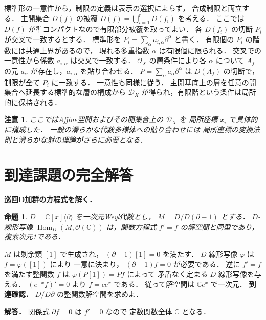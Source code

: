 \documentclass[a5paper,10pt,onecolumn]{jsarticle}
\makeatletter
\theoremstyle{mathnotetheorem}
\newtheorem{proposition}[theorem]{命題}
\newtheorem{remark}[theorem]{注意}
\renewcommand{\proofname}{証明}
\renewenvironment{proof}[1][\proofname]{%
  \par\pushQED{\qed}\normalfont\topsep4\p@\@plus2\p@\relax
  \trivlist\item[\hskip\labelsep\bfseries #1]\ignorespaces
}{\popQED\endtrivlist\@endpefalse}
\makeatother
\begin{document}
\begin{proof}
標準形の一意性から，制限の定義は表示の選択によらず，
合成制限と両立する．
主開集合 $D(f)$ の被覆 $D(f)=\bigcup_{i=1}^r D(f_i)$ を考える．
ここでは $D(f)$ が準コンパクトなので有限部分被覆を取ってよい．
各 $D(f_i)$ の切断 $P_i$ が交叉で一致するとする．
標準形を $P_i=\sum_\alpha a_{i,\alpha}\partial^\alpha$ と書く．
有限個の $P_i$ の階数には共通上界があるので，
現れる多重指数 $\alpha$ は有限個に限られる．
交叉での一意性から係数 $a_{i,\alpha}$ は交叉で一致する．
$\mathcal O_X$ の層条件により各 $\alpha$ について
$A_f$ の元 $a_\alpha$ が存在し，$a_{i,\alpha}$ を貼り合わせる．
$P=\sum_\alpha a_\alpha\partial^\alpha$ は
$D(A_f)$ の切断で，制限が全て $P_i$ に一致する．
一意性も同様に従う．
主開基底上の層を任意の開集合へ延長する標準的な層の構成から
$\mathcal D_X$ が得られ，有限階という条件は局所的に保持される．
\end{proof}
\begin{remark}
ここではAffine空間およびその開集合上の $\mathcal D_X$ を
局所座標 $x_i$ で具体的に構成した．
一般の滑らかな代数多様体への貼り合わせには
局所座標の変換法則と滑らかな射の理論がさらに必要となる．
\end{remark}


\section{到達課題の完全解答}
\noindent\textbf{巡回D加群の方程式を解く．}
\begin{proposition}
$D=\mathbb C[x]\langle\partial\rangle$
を一次元Weyl代数とし，
$M=D/D(\partial-1)$ とする．
$D$-線形写像
$\operatorname{Hom}_D(M,\mathcal O(\mathbb C))$
は，関数方程式 $f'=f$ の解空間と同型であり，
複素次元1である．
\end{proposition}
\begin{proof}
$M$ は剰余類 $[1]$ で生成され，
$(\partial-1)[1]=0$ を満たす．
$D$-線形写像 $\varphi$ は $f=\varphi([1])$ により
一意に決まり，
$(\partial-1)f=0$ が必要である．
逆に $f'=f$ を満たす整関数 $f$ は
$\varphi(P[1])=Pf$ によって
矛盾なく定まる $D$-線形写像を与える．
$(e^{-x}f)'=0$ より $f=ce^x$ である．
従って解空間は $\mathbb Ce^x$ で一次元．
\end{proof}
\noindent\textbf{到達確認．}
$D/D\partial$ の整関数解空間を求めよ．
\par\noindent\textbf{解答．}
関係式 $\partial f=0$ は $f'=0$ なので
定数関数全体 $\mathbb C$ となる．
\end{document}
